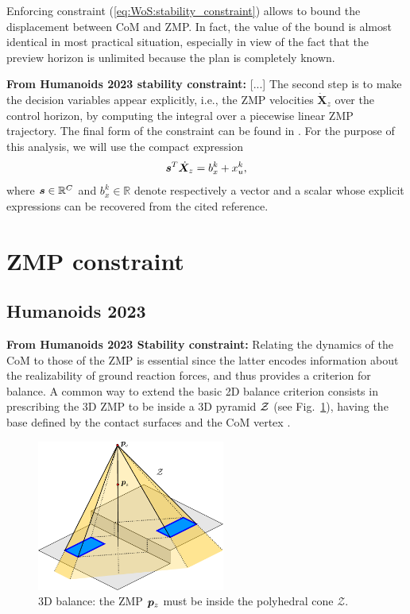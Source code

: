 Enforcing constraint (\ref{eq:WoS:stability_constraint}) allows to bound the displacement between CoM and ZMP. In fact, the value of the bound is almost identical in most practical situation, especially in view of the fact that the preview horizon is unlimited because the plan is completely known.

\textbf{From Humanoids 2023 stability constraint:}
[...] The second step is to make the decision variables appear explicitly, i.e., the ZMP velocities $\dot{\bm{X}}_z$ over the control horizon, by computing the integral over a piecewise linear ZMP trajectory. The final form of the constraint can be found in \cite{Scianca2020TRO}. For the purpose of this analysis, we will use the compact expression
\begin{equation}\label{eq:FAPA:stability_constraint}
    {\bm{s}}^T \dot{\bm{X}}_z = b_x^k + x_u^k,
\end{equation}
where ${\bm{s}}\in\mathbb{R}^C$ and $b_x^k\in\mathbb{R}$ denote respectively a vector and a scalar whose explicit expressions can be recovered from the cited reference.


\section{ZMP constraint}
\subsection{Humanoids 2023}
\textbf{From Humanoids 2023 Stability constraint:} Relating the dynamics of the CoM to those of the ZMP is essential since the latter encodes information about the realizability of ground reaction forces, and thus provides a criterion for balance. 
A common way to extend the basic 2D balance criterion consists in prescribing the 3D ZMP to be inside a 3D pyramid $\cal Z$ (see Fig.~\ref{fig:FAPA:balance3D}), having the base defined by the contact surfaces and the CoM vertex \cite{Sugihara2002ICRA, Cipriano2023RAS}.

\begin{figure}
    \centering
    \includegraphics[width=0.55\textwidth]{figures/balance3d.pdf}
    \caption{3D balance: the ZMP ${\bm{p}}_z$ must be inside the polyhedral cone $\mathcal{Z}$.}
    \label{fig:FAPA:balance3D}
\end{figure}


